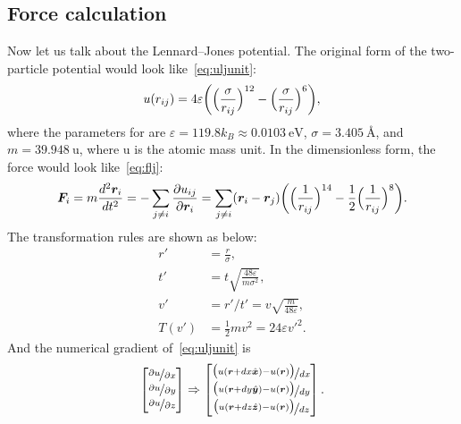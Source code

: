 \subsection{Force calculation}\label{ssec:force}

Now let us talk about the Lennard--Jones potential.
The original form of the two-particle potential would look like~\eqref{eq:uljunit}:
%
\begin{equation}\label{eq:uljunit}
    u(r_{ij}) = 4 \varepsilon \biggl( \Bigl( \frac{ \sigma }{ r_{ij} } \Bigr)^{12}
    -\Bigl( \frac{ \sigma }{ r_{ij} } \Bigr)^6 \biggr),
\end{equation}
%
where the parameters for  are $\varepsilon = 119.8 k_B \approx \SI{0.0103}{\electronvolt}$,
$\sigma = \SI{3.405}{\angstrom}$, and $m = \SI{39.948}{\atomicmassunit}$, where
$\si{\atomicmassunit}$ is the atomic mass unit.
In the dimensionless form,
the force would look like~\eqref{eq:flj}:
%
\begin{equation}\label{eq:flj}
    \bm{F}_i = m\frac{ d^2 \bm{r}_i }{ d t^2 } = -\sum_{j \neq i}\frac{ \partial u_{ij} }{ \partial \bm{r}_i }
    = \sum_{j \neq i} (\bm{r}_i - \bm{r}_j)
    \biggl( \Bigl( \frac{ 1 }{ r_{ij} } \Bigr)^{14}
    -\frac{ 1 }{ 2 } \Bigl( \frac{ 1 }{ r_{ij} } \Bigr)^8 \biggr).
\end{equation}
%
The transformation rules are shown as below:
%
\begin{align}
    r'    & = \frac{ r }{ \sigma },                                          \\
    t'    & = t \sqrt{\frac{ 48 \varepsilon }{ m \sigma^2 }},                \\
    v'    & = r' / t' = v \sqrt{\frac{ m }{ 48 \varepsilon }},               \\
    T(v') & = \frac{ 1 }{ 2 } m v^2 = 24 \varepsilon v'^2.\label{eq:kinetic}
\end{align}
%
And the numerical gradient of~\eqref{eq:uljunit} is
%
\begin{equation}\label{eq:dudr}
    \begin{bmatrix}
        \nicefrac{ \partial u }{ \partial x } \\
        \nicefrac{ \partial u }{ \partial y } \\
        \nicefrac{ \partial u }{ \partial z }
    \end{bmatrix}
    \Rightarrow
    \begin{bmatrix}
        \nicefrac{ \bigl( u(\bm{r} + dx \hat{\bm{x}}) - u(\bm{r}) \bigr) }{ dx } \\
        \nicefrac{ \bigl( u(\bm{r} + dy \hat{\bm{y}}) - u(\bm{r}) \bigr) }{ dy } \\
        \nicefrac{ \bigl( u(\bm{r} + dz \hat{\bm{z}}) - u(\bm{r}) \bigr) }{ dz }
    \end{bmatrix}.
\end{equation}
